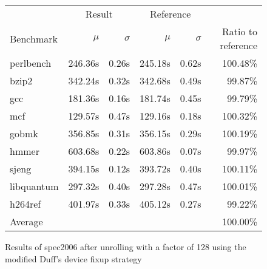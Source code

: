\begin{figure}[h]
    \begin{center}
        \begin{tabular}{lrrrrr}
            \toprule
            & \multicolumn{2}{c}{Result} & \multicolumn{2}{c}{Reference}\\
            Benchmark & $\mu$ & $\sigma$ & $\mu$ & $\sigma$ & Ratio to reference\\
            \midrule
            perlbench & 246.36s & 0.26s & 245.18s & 0.62s & 100.48\%\\
            bzip2 & 342.24s & 0.32s & 342.68s & 0.49s & 99.87\%\\
            gcc & 181.36s & 0.16s & 181.74s & 0.45s & 99.79\%\\
            mcf & 129.57s & 0.47s & 129.16s & 0.18s & 100.32\%\\
            gobmk & 356.85s & 0.31s & 356.15s & 0.29s & 100.19\%\\
            hmmer & 603.68s & 0.22s & 603.86s & 0.07s & 99.97\%\\
            sjeng & 394.15s & 0.12s & 393.72s & 0.40s & 100.11\%\\
            libquantum & 297.32s & 0.40s & 297.28s & 0.47s & 100.01\%\\
            h264ref & 401.97s & 0.33s & 405.12s & 0.27s & 99.22\%\\
            \midrule
            Average & & & & & 100.00\%\\
            \bottomrule
        \end{tabular}
    \end{center}
    \caption{Results of spec2006 after unrolling with a factor of 128 using the modified Duff's device fixup strategy}
    \label{fig:eval:perf:duff:128}
\end{figure}
